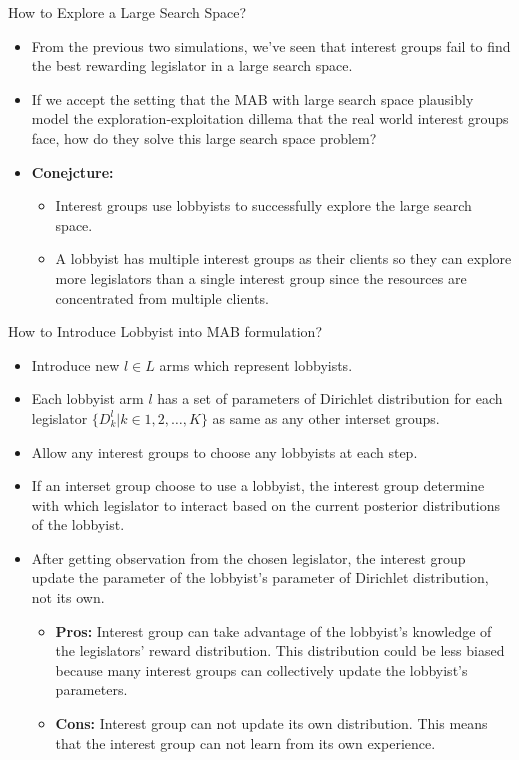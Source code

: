 \documentclass{beamer}
\begin{document}
	\begin{frame}{How to Explore a Large Search Space?}
		\begin{itemize}
			\item From the previous two simulations, we've seen that interest groups fail to find the best rewarding legislator in a large search space.
			\item If we accept the setting that the MAB with large search space plausibly model the exploration-exploitation dillema that the real world interest groups face, how do they solve this large search space problem?
			\item \textbf{Conejcture: }
				\begin{itemize}
				\item Interest groups use lobbyists to successfully explore the large search space. 
				\item A lobbyist has multiple interest groups as their clients so they can explore more legislators than a single interest group since the resources are concentrated from multiple clients.
				\end{itemize}
	\end{itemize}
	\end{frame}

	\begin{frame}{How to Introduce Lobbyist into MAB formulation?}
		\begin{itemize}
			\item Introduce new $l \in L$ arms which represent lobbyists.
			\item Each lobbyist arm $l$ has a set of parameters of Dirichlet distribution for each legislator $\{D_k^l | k \in 1, 2, \hdots, K \}$ as same as any other interset groups.
			\item Allow any interest groups to choose any lobbyists at each step. 
			\item If an interset group choose to use a lobbyist, the interest group determine with which legislator to interact based on the current posterior distributions of the lobbyist.
			\item After getting observation from the chosen legislator, the interest group update the parameter of the lobbyist's parameter of Dirichlet distribution, not its own.
				\begin{itemize}
					\item \textbf{Pros:} Interest group can take advantage of the lobbyist's knowledge of the legislators' reward distribution. This distribution could be less biased because many interest groups can collectively update the lobbyist's parameters.
					\item \textbf{Cons:} Interest group can not update its own distribution. This means that the interest group can not learn from its own experience.
				\end{itemize}  
		\end{itemize}
	\end{frame}
\end{document}
